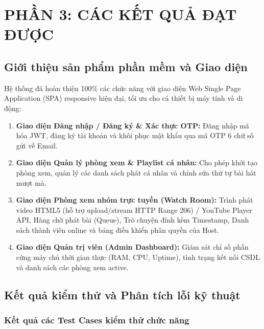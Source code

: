 \documentclass[12pt,a4paper]{extarticle}
\begin{document}
\newpage

\section{PHẦN 3: CÁC KẾT QUẢ ĐẠT ĐƯỢC}

\subsection{Giới thiệu sản phẩm phần mềm và Giao diện}

Hệ thống đã hoàn thiện 100\% các chức năng với giao diện Web Single Page Application (SPA) responsive hiện đại, tối ưu cho cả thiết bị máy tính và di động:
\begin{enumerate}[leftmargin=1.2cm]
    \item \textbf{Giao diện Đăng nhập / Đăng ký \& Xác thực OTP:} Đăng nhập mã hóa JWT, đăng ký tài khoản và khôi phục mật khẩu qua mã OTP 6 chữ số gửi về Email.
    \item \textbf{Giao diện Quản lý phòng xem \& Playlist cá nhân:} Cho phép khởi tạo phòng xem, quản lý các danh sách phát cá nhân và chỉnh sửa thứ tự bài hát mượt mà.
    \item \textbf{Giao diện Phòng xem nhóm trực tuyến (Watch Room):} Trình phát video HTML5 (hỗ trợ upload/stream HTTP Range 206) / YouTube Player API, Hàng chờ phát bài (Queue), Trò chuyện đính kèm Timestamp, Danh sách thành viên online và bảng điều khiển phân quyền của Host.
    \item \textbf{Giao diện Quản trị viên (Admin Dashboard):} Giám sát chỉ số phần cứng máy chủ thời gian thực (RAM, CPU, Uptime), tình trạng kết nối CSDL và danh sách các phòng xem active.
\end{enumerate}

\subsection{Kết quả kiểm thử và Phân tích lỗi kỹ thuật}

\subsubsection{Kết quả các Test Cases kiểm thử chức năng}
\end{document}

